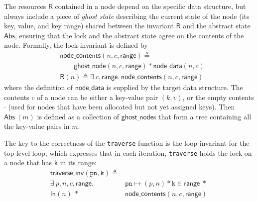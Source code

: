 \documentclass[sigplan,screen]{acmart}
\newcommand{\treerep}{\ensuremath{\mathsf{Abs}}}
\newcommand{\inFP}{\ensuremath{\mathsf{In }}}
\begin{document}
The resources $\mathsf{R}$ contained in a node depend on the specific data structure, but always include a piece of \emph{ghost state} describing the current state of the node (its key, value, and key range) shared between the invariant $\mathsf{R}$ and the abstract state $\treerep$, ensuring that the lock and the abstract state agree on the contents of the node. Formally, the lock invariant is defined by 
\begin{align*}&\mathsf{node\_contents}(n, c, \mathsf{range}) \triangleq \\ 
	&\qquad\mathsf{ghost\_node}(n, c,\mathsf{range}) \ast \mathsf{node\_data}(n, c) \\
	&\mathsf{R}(n) \triangleq \exists\ c, \mathsf{range}.\ \mathsf{node\_contents}(n, c, \mathsf{range})
\end{align*}
where the definition of $\mathsf{node\_data}$ is supplied by the target data structure. The contents $c$ of a node can be either a key-value pair $(k, v)$, or the empty contents $\cdot$ (used for nodes that have been allocated but not yet assigned keys). Then $\treerep\ (m)$ is defined as a collection of $\mathsf{ghost\_node}$s that form a tree containing all the key-value pairs in $m$.



The key to the correctness of the \texttt{traverse} function is the loop invariant for the top-level loop, which expresses that in each iteration, \lstinline{traverse} holds the lock on a node that has \lstinline{k} in its range:
\begin{align*}\mathsf{traverse\_inv}(\texttt{pn}, \texttt{k}) \triangleq \\ \exists \ p, n, c, \mathsf{range}.\ &\texttt{pn} \mapsto (p, n) \ast \texttt{k} \in \mathsf{range}\ \ast \ \\  \inFP(n)  \ \ast \  &\mathsf{node\_contents}(n, c, \mathsf{range})
\end{align*}
\end{document}
